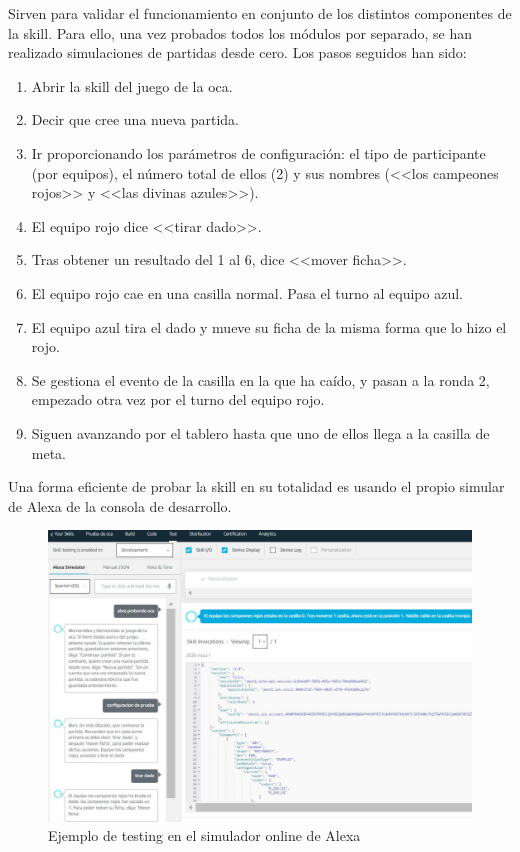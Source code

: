 Sirven para validar el funcionamiento en conjunto de los distintos componentes de la skill. Para ello, una vez probados todos los módulos por separado, se han realizado simulaciones de partidas desde cero. Los pasos seguidos han sido:
\begin{enumerate}
	\item Abrir la skill del juego de la oca.
	\item Decir que cree una nueva partida.
	\item Ir proporcionando los parámetros de configuración: el tipo de participante (por equipos), el número total de ellos (2) y sus nombres (<<los campeones rojos>> y <<las divinas azules>>).
	\item El equipo rojo dice <<tirar dado>>.
	\item Tras obtener un resultado del 1 al 6, dice <<mover ficha>>.
	\item El equipo rojo cae en una casilla normal. Pasa el turno al equipo azul.
	\item El equipo azul tira el dado y mueve su ficha de la misma forma que lo hizo el rojo.
	\item Se gestiona el evento de la casilla en la que ha caído, y pasan a la ronda 2, empezado otra vez por el turno del equipo rojo.
	\item Siguen avanzando por el tablero hasta que uno de ellos llega a la casilla de meta.
\end{enumerate}

Una forma eficiente de probar la skill en su totalidad es usando el propio simular de Alexa de la consola de desarrollo.

\begin{figure}[H]
	\centering
	\includegraphics[width=1\textwidth]{imgs/test-1.jpg}
	\caption{Ejemplo de testing en el simulador online de Alexa}
	\label{fig:test-1}
\end{figure}

